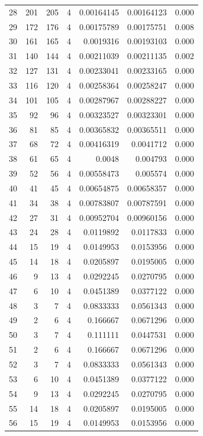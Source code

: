\begin{tabular}{r r r r r r r}
28 & 201 & 205 & 4 & 0.00164145 & 0.00164123 & 0.000 \\
29 & 172 & 176 & 4 & 0.00175789 & 0.00175751 & 0.008 \\
30 & 161 & 165 & 4 & 0.0019316 & 0.00193103 & 0.000 \\
31 & 140 & 144 & 4 & 0.00211039 & 0.00211135 & 0.002 \\
32 & 127 & 131 & 4 & 0.00233041 & 0.00233165 & 0.000 \\
33 & 116 & 120 & 4 & 0.00258364 & 0.00258247 & 0.000 \\
34 & 101 & 105 & 4 & 0.00287967 & 0.00288227 & 0.000 \\
35 & 92 & 96 & 4 & 0.00323527 & 0.00323301 & 0.000 \\
36 & 81 & 85 & 4 & 0.00365832 & 0.00365511 & 0.000 \\
37 & 68 & 72 & 4 & 0.00416319 & 0.0041712 & 0.000 \\
38 & 61 & 65 & 4 & 0.0048 & 0.004793 & 0.000 \\
39 & 52 & 56 & 4 & 0.00558473 & 0.005574 & 0.000 \\
40 & 41 & 45 & 4 & 0.00654875 & 0.00658357 & 0.000 \\
41 & 34 & 38 & 4 & 0.00783807 & 0.00787591 & 0.000 \\
42 & 27 & 31 & 4 & 0.00952704 & 0.00960156 & 0.000 \\
43 & 24 & 28 & 4 & 0.0119892 & 0.0117833 & 0.000 \\
44 & 15 & 19 & 4 & 0.0149953 & 0.0153956 & 0.000 \\
45 & 14 & 18 & 4 & 0.0205897 & 0.0195005 & 0.000 \\
46 & 9 & 13 & 4 & 0.0292245 & 0.0270795 & 0.000 \\
47 & 6 & 10 & 4 & 0.0451389 & 0.0377122 & 0.000 \\
48 & 3 & 7 & 4 & 0.0833333 & 0.0561343 & 0.000 \\
49 & 2 & 6 & 4 & 0.166667 & 0.0671296 & 0.000 \\
50 & 3 & 7 & 4 & 0.111111 & 0.0447531 & 0.000 \\
51 & 2 & 6 & 4 & 0.166667 & 0.0671296 & 0.000 \\
52 & 3 & 7 & 4 & 0.0833333 & 0.0561343 & 0.000 \\
53 & 6 & 10 & 4 & 0.0451389 & 0.0377122 & 0.000 \\
54 & 9 & 13 & 4 & 0.0292245 & 0.0270795 & 0.000 \\
55 & 14 & 18 & 4 & 0.0205897 & 0.0195005 & 0.000 \\
56 & 15 & 19 & 4 & 0.0149953 & 0.0153956 & 0.000 \\

\end{tabular}
